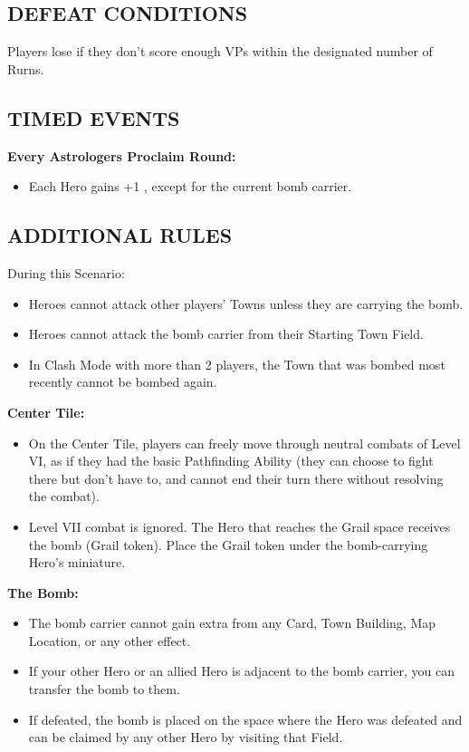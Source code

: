 \begin{multicols}{2}
\subsection*{\MakeUppercase{Defeat Conditions}}
Players lose if they don't score enough VPs within the designated number of Rurns.

\subsection*{\MakeUppercase{Timed Events}}

\textbf{Every Astrologers Proclaim Round:}
\begin{itemize}
  \item Each Hero gains +1 , except for the current bomb carrier.
\end{itemize}

\subsection*{\MakeUppercase{Additional Rules}}

During this Scenario:

\begin{itemize}
  \item Heroes cannot attack other players' Towns unless they are carrying the bomb.
  \item Heroes cannot attack the bomb carrier from their Starting Town Field.
  \item In Clash Mode with more than 2 players, the Town that was bombed most recently cannot be bombed again.
\end{itemize}

\textbf{Center Tile:}

\begin{itemize}
  \item On the Center Tile, players can freely move through neutral combats of Level VI, as if they had the basic Pathfinding Ability (they can choose to fight there but don't have to, and cannot end their turn there without resolving the combat).
  \item Level VII combat is ignored. The Hero that reaches the Grail space receives the bomb (Grail token). Place the Grail token under the bomb-carrying Hero's miniature.
\end{itemize}

\textbf{The Bomb:}

\begin{itemize}
  \item The bomb carrier cannot gain extra  from any Card, Town Building, Map Location, or any other effect.
  \item If your other Hero or an allied Hero is adjacent to the bomb carrier, you can transfer the bomb to them.
  \item If defeated, the bomb is placed on the space where the Hero was defeated and can be claimed by any other Hero by visiting that Field.


\end{itemize}
\end{multicols}
